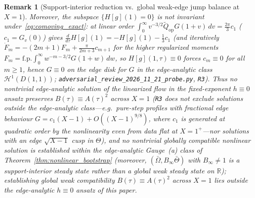 \documentclass[11pt,a4paper]{article}
\newtheorem{remark}{Remark}
\begin{document}
\begin{remark}[Support-interior reduction vs.\ global weak-edge jump balance at $X=1$]
Moreover, the subspace $\{H[g](1)=0\}$ is \emph{not} invariant under~\eqref{eq:comoving_exact}: at linear order $\int_0^\infty v^{-3/2}\widetilde{Q}_{\mathrm{op}}G(1+v)\,dv=\tfrac{2\pi}{3}c_1$ ($c_1=G_v(0)$) gives $\frac{d}{d\tau}H[g](1)=-H[g](1)-\tfrac13 c_1$ (and iteratively $\dot F_m=-(2m+1)F_m+\frac{\pi}{2m+3}c_{m+1}$ for the higher regularized moments $F_m=\mathrm{f.p.}\int_0^\infty w^{-m-3/2}G(1+w)\,dw$, so $H[g](1,\tau)\equiv 0$ forces $c_m\equiv 0$ for all $m\ge 1$, hence $G\equiv 0$ on the edge disk for $G$ in the edge-analytic class $\mathcal{H}^1(D(1,1))$; \texttt{adversarial\_review\_2026\_11\_21\_probe.py}, \texttt{R3}). Thus no nontrivial edge-analytic solution of the linearized flow in the fixed-exponent $h\equiv 0$ ansatz preserves $B(\tau)\equiv A(\tau)^2$ across $X=1$ (\texttt{R3} does not exclude solutions outside the edge-analytic class---e.g.\ pure-step profiles with fractional edge behaviour $G=c_1(X-1)+O((X-1)^{9/8})$, where $c_1$ is generated at quadratic order by the nonlinearity even from data flat at $X=1^+$---nor solutions with an edge $\sqrt{X-1}$ cusp in $\Theta$), and no nontrivial globally compatible nonlinear solution is established within the edge-analytic Gauge~(a) class of Theorem~\ref{thm:nonlinear_bootstrap} (moreover, $(\bar\Omega,B_\infty\bar\Theta)$ with $B_\infty\ne 1$ is a support-interior steady state rather than a global weak steady state on $\mathbb{R}$); establishing global weak compatibility $B(\tau)\equiv A(\tau)^2$ across $X=1$ lies outside the edge-analytic $h\equiv 0$ ansatz of this paper.
\end{remark}
\end{document}
